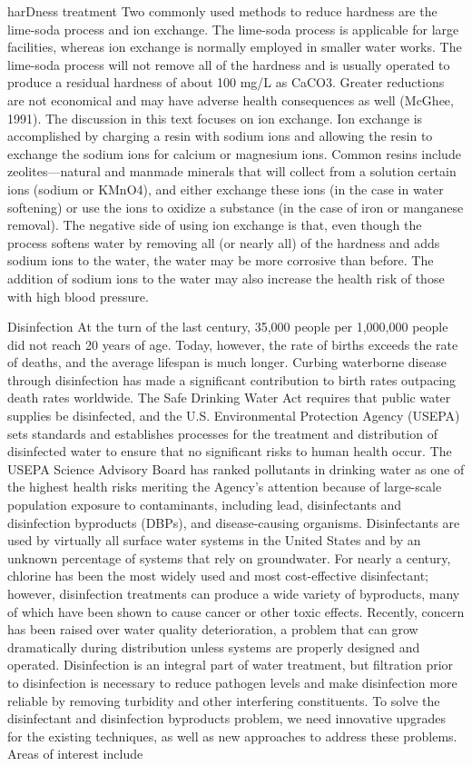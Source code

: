 \documentclass{article}
\begin{document}
harDness treatment Two commonly used methods to reduce hardness are the
lime-soda process and ion exchange. The lime-soda process is applicable
for large facilities, whereas ion exchange is normally employed in
smaller water works. The lime-soda process will not remove all of the
hardness and is usually operated to produce a residual hardness of about
100 mg/L as CaCO3. Greater reductions are not economical and may have
adverse health consequences as well (McGhee, 1991). The discussion in
this text focuses on ion exchange. Ion exchange is accomplished by
charging a resin with sodium ions and allowing the resin to exchange the
sodium ions for calcium or magnesium ions. Common resins include
zeolites---natural and manmade minerals that will collect from a
solution certain ions (sodium or KMnO4), and either exchange these ions
(in the case in water softening) or use the ions to oxidize a substance
(in the case of iron or manganese removal). The negative side of using
ion exchange is that, even though the process softens water by removing
all (or nearly all) of the hardness and adds sodium ions to the water,
the water may be more corrosive than before. The addition of sodium ions
to the water may also increase the health risk of those with high blood
pressure.

Disinfection At the turn of the last century, 35,000 people per
1,000,000 people did not reach 20 years of age. Today, however, the rate
of births exceeds the rate of deaths, and the average lifespan is much
longer. Curbing waterborne disease through disinfection has made a
significant contribution to birth rates outpacing death rates worldwide.
The Safe Drinking Water Act requires that public water supplies be
disinfected, and the U.S. Environmental Protection Agency (USEPA) sets
standards and establishes processes for the treatment and distribution
of disinfected water to ensure that no significant risks to human health
occur. The USEPA Science Advisory Board has ranked pollutants in
drinking water as one of the highest health risks meriting the Agency's
attention because of large-scale population exposure to contaminants,
including lead, disinfectants and disinfection byproducts (DBPs), and
disease-causing organisms. Disinfectants are used by virtually all
surface water systems in the United States and by an unknown percentage
of systems that rely on groundwater. For nearly a century, chlorine has
been the most widely used and most cost-effective disinfectant; however,
disinfection treatments can produce a wide variety of byproducts, many
of which have been shown to cause cancer or other toxic effects.
Recently, concern has been raised over water quality deterioration, a
problem that can grow dramatically during distribution unless systems
are properly designed and operated. Disinfection is an integral part of
water treatment, but filtration prior to disinfection is necessary to
reduce pathogen levels and make disinfection more reliable by removing
turbidity and other interfering constituents. To solve the disinfectant
and disinfection byproducts problem, we need innovative upgrades for the
existing techniques, as well as new approaches to address these
problems. Areas of interest include
\end{document}
